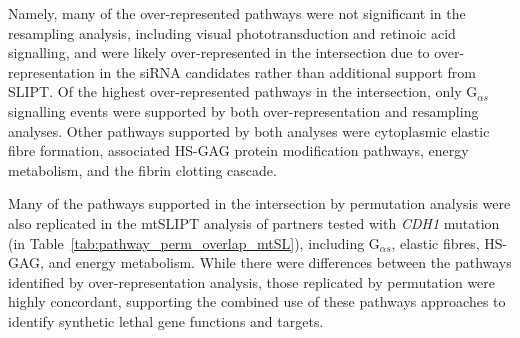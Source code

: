 Namely, many of the over-represented \glspl{pathway} were not significant in the resampling analysis, including visual phototransduction and retinoic acid signalling, and were likely over-represented in the intersection due to over-represent\-ation in the \gls{siRNA} candidates rather than additional support from \gls{SLIPT}. 
Of the highest over-represented \glspl{pathway} in the intersection, only G$_{\alpha s}$ signalling events were supported by both over-represent\-ation and resampling analyses. Other \glspl{pathway} supported by both analyses were cytoplasmic elastic fibre formation, associated HS-GAG protein modification \glspl{pathway}, energy metabolism, and the fibrin clotting cascade.  

Many of the \glspl{pathway} supported in the intersection by permutation analysis were also replicated in the \acrshort{mtSLIPT} analysis of partners tested with \textit{CDH1} \gls{mutation} (in Table~\ref{tab:pathway_perm_overlap_mtSL}), including G$_{\alpha s}$, elastic fibres, HS-GAG, and energy metabolism. While there were differences between the \glspl{pathway} identified by over-representation analysis, those replicated by permutation were highly concordant, supporting the combined use of these \glspl{pathway} approaches to identify \gls{synthetic lethal} gene functions and targets. 

